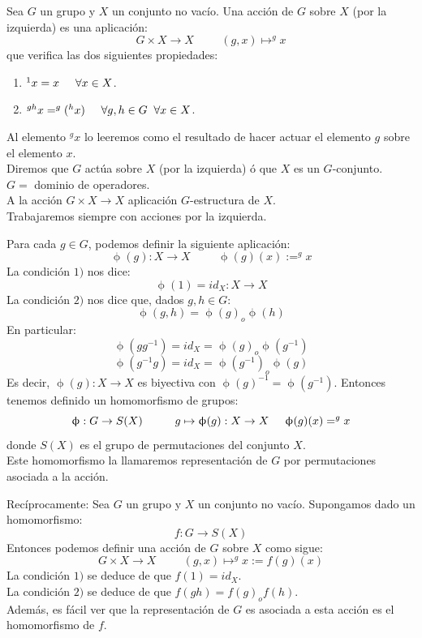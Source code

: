 \documentclass[11pt,a4paper]{article}
\begin{document}
Sea $G$ un grupo y $X$ un conjunto no vacío. Una acción de $G$ sobre $X$ (por la izquierda) es una aplicación:
$$G \times X \to X \hspace{1cm} (g,x) \mapsto ^{g}x$$
que verifica las dos siguientes propiedades:
\begin{enumerate}[label = \arabic*)]
\item $^{1}x = x \hspace{0.5cm} \forall x \in X$.
\item $^{gh}x = ^{g}(^{h}x) \hspace{0.5cm} \forall g, h \in G \hspace{0.2cm} \forall x \in X$.
\end{enumerate}
Al elemento $^{g}x$ lo leeremos como el resultado de hacer actuar el elemento $g$ sobre el elemento $x$. \\
Diremos que $G$ actúa sobre $X$ (por la izquierda) ó que $X$ es un $G$-conjunto. \\
$G =$ dominio de operadores. \\
A la acción $G \times X \to X$ aplicación $G$-estructura de $X$. \\
Trabajaremos siempre con acciones por la izquierda.

Para cada $g \in G$, podemos definir la siguiente aplicación:
$$\upphi (g): X \to X \hspace{1cm} \upphi (g)(x) := ^{g}x$$
La condición $1)$ nos dice:
$$\upphi(1) = id_{X}: X \to X$$
La condición $2)$ nos dice que, dados $g, h \in G$:
$$\upphi(g,h) = \upphi(g)_{o}\upphi(h)$$
En particular:
$$\upphi(gg^{-1}) = id_{X} = \upphi(g)_{o}\upphi(g^{-1})$$
$$\upphi(g^{-1}g) = id_{X} = \upphi(g^{-1})_{o}\upphi(g)$$
Es decir, $\upphi(g): X \to X$ es biyectiva con $\upphi(g)^{-1} = \upphi(g^{-1})$. Entonces tenemos definido un homomorfismo de grupos:
$$\upphi: G \to S(X) \hspace{1cm} g \mapsto \upphi(g): X \to X \hspace{0.5cm} \upphi(g)(x) = ^{g}x$$
donde $S(X)$ es el grupo de permutaciones del conjunto $X$. \\
Este homomorfismo la llamaremos representación de $G$ por permutaciones asociada a la acción.

Recíprocamente: Sea $G$ un grupo y $X$ un conjunto no vacío. Supongamos dado un homomorfismo:
$$f: G \to S(X)$$
Entonces podemos definir una acción de $G$ sobre $X$ como sigue:
$$G \times X \to X \hspace{1cm} (g, x) \mapsto ^{g}x := f(g)(x)$$
La condición $1)$ se deduce de que $f(1) = id_{X}$. \\
La condición $2)$ se deduce de que $f(gh) = f(g)_{o}f(h)$. \\
Además, es fácil ver que la representación de $G$ es asociada a esta acción es el homomorfismo de $f$.
\end{document}
